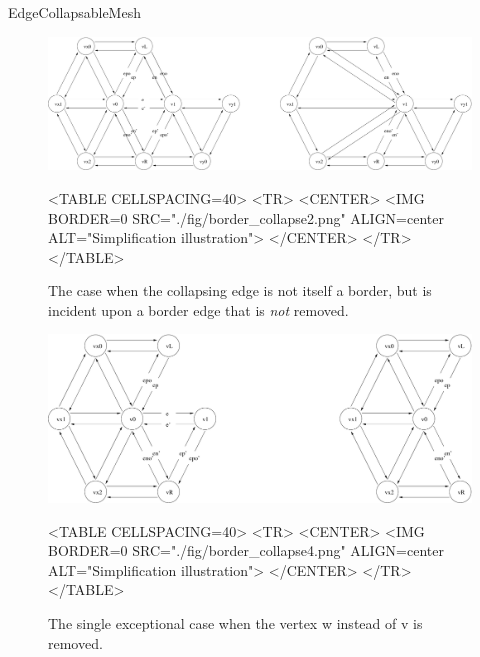 \begin{ccRefConcept}{EdgeCollapsableMesh}
\begin{figure}[htbp]
\begin{ccTexOnly}
\begin{center}
\includegraphics[width=17cm]{Surface_mesh_simplification_ref/fig/border_collapse2} %
\end{center}
\end{ccTexOnly}
\begin{ccHtmlOnly}
<TABLE CELLSPACING=40>
<TR>
<CENTER>
<IMG BORDER=0 SRC="./fig/border_collapse2.png" ALIGN=center ALT="Simplification illustration">
</CENTER>
</TR>
</TABLE>
\end{ccHtmlOnly}
\caption{The case when the collapsing edge is not itself a border, but is incident upon a border edge that is {\em not} removed.}
\end{figure}

\begin{figure}[htbp]
\begin{ccTexOnly}
\begin{center}
\includegraphics[width=17cm]{Surface_mesh_simplification_ref/fig/border_collapse4} %
\end{center}
\end{ccTexOnly}
\begin{ccHtmlOnly}
<TABLE CELLSPACING=40>
<TR>
<CENTER>
<IMG BORDER=0 SRC="./fig/border_collapse4.png" ALIGN=center ALT="Simplification illustration">
</CENTER>
</TR>
</TABLE>
\end{ccHtmlOnly}
\caption{The single exceptional case when the vertex w instead of v is removed.}
\end{figure}



\end{ccRefConcept}
